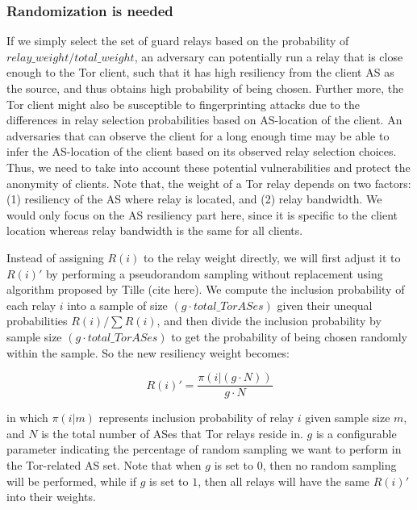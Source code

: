\subsubsection{Randomization is needed}

If we simply select the set of guard relays based on the probability of $relay\_weight/total\_weight$, an adversary can potentially run a relay that is close enough to the Tor client, such that it has high resiliency from the client AS as the source, and thus obtains high probability of being chosen. Further more, the Tor client might also be susceptible to fingerprinting attacks due to the differences in relay selection probabilities based on AS-location of the client. An adversaries that can observe the client for a long enough time may be able to infer the AS-location of the client based on its observed relay selection choices. Thus, we need to take into account these potential vulnerabilities and protect the anonymity of clients. Note that, the weight of a Tor relay depends on two factors: (1) resiliency of the AS where relay is located, and (2) relay bandwidth. We would only focus on the AS resiliency part here, since it is specific to the client location whereas relay bandwidth is the same for all clients. 

Instead of assigning $R(i)$ to the relay weight  directly, we will first adjust it to $R(i)\prime$ by performing a pseudorandom sampling without replacement using algorithm proposed by Tille (cite here). We compute the inclusion probability of each relay $i$ into a sample of size $(g \cdot total\_TorASes)$ given their unequal probabilities $R(i)/\sum R(i)$, and then divide the inclusion probability by sample size $(g \cdot total\_TorASes)$ to get the probability of being chosen randomly within the sample. So the new resiliency weight becomes:

\begin{equation*}
R(i) \prime = \frac {\pi(i | (g \cdot N))} {g \cdot N}
\end{equation*}

in which $\pi(i | m)$ represents inclusion probability of relay $i$ given sample size $m$, and $N$ is the total number of ASes that Tor relays reside in. $g$ is a configurable parameter indicating the percentage of random sampling we want to perform in the Tor-related AS set. Note that when $g$ is set to $0$, then no random sampling will be performed, while if $g$ is set to $1$, then all relays will have the same $R(i)\prime$ into their weights.

